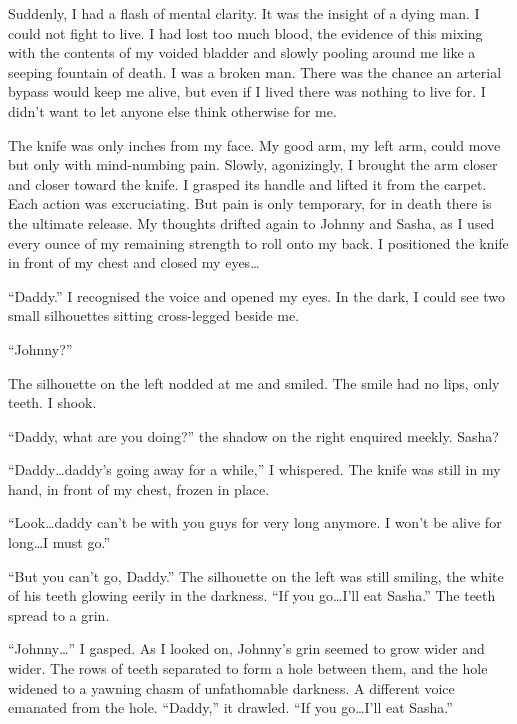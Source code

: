 Suddenly, I had a flash of mental clarity. It was the insight of a
dying man. I could not fight to live. I had lost too much blood,
the evidence of this mixing with the contents of my voided bladder
and slowly pooling around me like a seeping fountain of death. I
was a broken man. There was the chance an arterial bypass would
keep me alive, but even if I lived there was nothing to live for. I
didn't want to let anyone else think otherwise for me.



The knife was only inches from my face. My good arm, my left arm,
could move but only with mind-numbing pain. Slowly, agonizingly, I
brought the arm closer and closer toward the knife. I grasped its
handle and lifted it from the carpet. Each action was excruciating.
But pain is only temporary, for in death there is the ultimate
release. My thoughts drifted again to Johnny and Sasha, as I used
every ounce of my remaining strength to roll onto my back. I
positioned the knife in front of my chest and closed my
eyes{\ldots}



``Daddy.'' I recognised the voice and opened my eyes. In the dark, I
could see two small silhouettes sitting cross-legged beside
me.

``Johnny?''

The silhouette on the left nodded at me and smiled. The smile had
no lips, only teeth. I shook.

``Daddy, what are you doing?'' the shadow on the right enquired
meekly. Sasha?

``Daddy{\ldots}daddy's going away for a while,'' I whispered. The knife
was still in my hand, in front of my chest, frozen in place.

``Look{\ldots}daddy can't be with you guys for very long anymore. I won't
be alive for long{\ldots}I must go.''

``But you can't go, Daddy.'' The silhouette on the left was still
smiling, the white of his teeth glowing eerily in the darkness. ``If
you go{\ldots}I'll eat Sasha.'' The teeth spread to a grin.



``Johnny{\ldots}'' I gasped. As I looked on, Johnny's grin seemed to grow
wider and wider. The rows of teeth separated to form a hole between
them, and the hole widened to a yawning chasm of unfathomable
darkness. A different voice emanated from the hole. ``Daddy,'' it
drawled. ``If you go{\ldots}I'll eat Sasha.''



